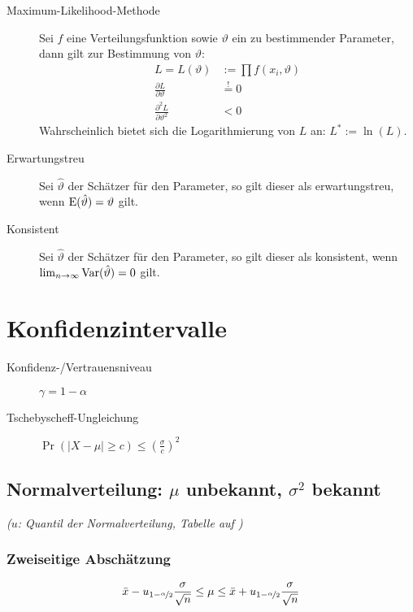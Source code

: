 \begin{description}
  \item [{Maximum-Likelihood-Methode}] 
	Sei $f$ eine Verteilungsfunktion sowie $\vartheta$ ein zu bestimmender Parameter, dann gilt zur Bestimmung von $\vartheta$:
	\begin{align*}
	  L=L(\vartheta)                              & :=\prod f(x_i, \vartheta)\\
	  \frac{\partial L}{\partial\vartheta}        & \stackrel{!}{=}0\\
	  \frac{\partial^2L}{\partial\vartheta^2} & <0
	\end{align*}
	Wahrscheinlich bietet sich die Logarithmierung von $L$ an: $L^{*}:=\ln(L)$.

  \item [{Erwartungstreu}] 
	Sei $\hat{\vartheta}$ der Schätzer für den Parameter, so gilt dieser als erwartungstreu, wenn $\operatorname{E}(\hat{\vartheta})=\vartheta$ gilt.
  \item [{Konsistent}] 
	Sei $\hat{\vartheta}$ der Schätzer für den Parameter, so gilt dieser als konsistent, wenn $\lim_{n\to\infty}\operatorname{Var}(\hat{\vartheta})=0$ gilt.
\end{description}

\section{Konfidenzintervalle}
\begin{description}
  \item [{Konfidenz-/Vertrauensniveau}] 
	$\gamma=1-\alpha$
  \item [{Tschebyscheff-Ungleichung}] 
	$\Pr(\lvert X-\mu \rvert \geq c)\leq\left(\frac{\sigma}{c}\right)^{2}$
\end{description}

\subsection*{Normalverteilung: $\mu$ unbekannt, $\sigma^{2}$ bekannt}

\emph{($u$: Quantil der Normalverteilung, Tabelle auf )}


\subsubsection*{Zweiseitige Abschätzung}
\[ \bar{x}-u_{1-\nicefrac{\alpha}{2}}\frac{\sigma}{\sqrt{n}}\leq\mu\leq\bar{x}+u_{1-\nicefrac{\alpha}{2}}\frac{\sigma}{\sqrt{n}} \]


